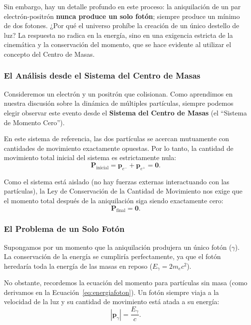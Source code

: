 \documentclass[11pt,a4paper]{book}
\begin{document}
Sin embargo, hay un detalle profundo en este proceso: la aniquilación de un par electrón-positrón \textbf{nunca produce un solo fotón}; siempre produce un mínimo de dos fotones. ¿Por qué el universo prohíbe la creación de un único destello de luz? La respuesta no radica en la energía, sino en una exigencia estricta de la cinemática y la conservación del momento, que se hace evidente al utilizar el concepto del Centro de Masas.

\subsubsection{El Análisis desde el Sistema del Centro de Masas}

Consideremos un electrón y un positrón que colisionan. Como aprendimos en nuestra discusión sobre la dinámica de múltiples partículas, siempre podemos elegir observar este evento desde el \textbf{Sistema del Centro de Masas} (el ``Sistema de Momento Cero''). 

En este sistema de referencia, las dos partículas se acercan mutuamente con cantidades de movimiento exactamente opuestas. Por lo tanto, la cantidad de movimiento total inicial del sistema es estrictamente nula:
\begin{equation}
    \boldsymbol{P}_{\text{inicial}} = \boldsymbol{p}_{e^-} + \boldsymbol{p}_{e^+} = \boldsymbol{0}.
\end{equation}

Como el sistema está aislado (no hay fuerzas externas interactuando con las partículas), la Ley de Conservación de la Cantidad de Movimiento nos exige que el momento total después de la aniquilación siga siendo exactamente cero:
\begin{equation}
    \boldsymbol{P}_{\text{final}} = \boldsymbol{0}.
    \label{eq:momento_final_cero}
\end{equation}

\subsubsection{El Problema de un Solo Fotón}

Supongamos por un momento que la aniquilación produjera un único fotón ($\gamma$). La conservación de la energía se cumpliría perfectamente, ya que el fotón heredaría toda la energía de las masas en reposo ($E_\gamma = 2m_e c^2$). 

No obstante, recordemos la ecuación del momento para partículas sin masa (como derivamos en la Ecuación~\eqref{eq:energiafoton}). Un fotón siempre viaja a la velocidad de la luz y su cantidad de movimiento está atada a su energía:
\begin{equation}
    |\boldsymbol{p}_\gamma| = \frac{E_\gamma}{c}.
\end{equation}
\end{document}
